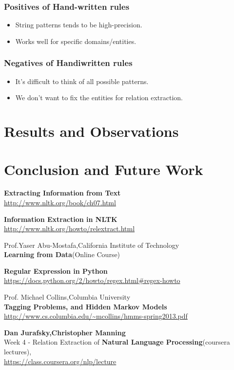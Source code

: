 \documentclass[12pt]{report}
\begin{document}
\subsection{Positives of Hand-written rules}
\begin{itemize}
\item String patterns tends to be  high-precision.
\item Works well for specific domains/entities.
\end{itemize}

\subsection{Negatives of Handiwritten rules}
\begin{itemize}
\item It's difficult to think of all possible patterns.
\item We don't want to fix the entities for relation extraction.
\end{itemize}

\chapter{Results and Observations}
\chapter{Conclusion and Future Work}


\begin{thebibliography}{99}
\textbf{Extracting Information from Text}\\
\url{http://www.nltk.org/book/ch07.html}

\textbf{Information Extraction in NLTK}\\
\url{http://www.nltk.org/howto/relextract.html}

Prof.Yaser Abu-Mostafa,California Institute of Technology\\
\textbf{Learning from Data}(Online Course)

\textbf{Regular Expression in Python}\\
\url{https://docs.python.org/2/howto/regex.html#regex-howto}

Prof. Michael Collins,Columbia University\\
\textbf{Tagging Problems, and Hidden Markov Models}\\
\url{http://www.cs.columbia.edu/~mcollins/hmms-spring2013.pdf}

\textbf{Dan Jurafsky,Christopher Manning}\\
Week 4 - Relation Extraction of \textbf{Natural Language Processing}(coursera lectures),\\
\url{https://class.coursera.org/nlp/lecture}
\end{thebibliography}
\end{document}
